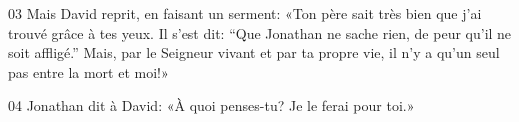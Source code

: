 
03 Mais David reprit, en faisant un serment: «Ton père sait très bien que j’ai trouvé grâce à tes yeux. Il s’est dit: “Que Jonathan ne sache rien, de peur qu’il ne soit affligé.” Mais, par le Seigneur vivant et par ta propre vie, il n’y a qu’un seul pas entre la mort et moi!»

04 Jonathan dit à David: «À quoi penses-tu? Je le ferai pour toi.»
